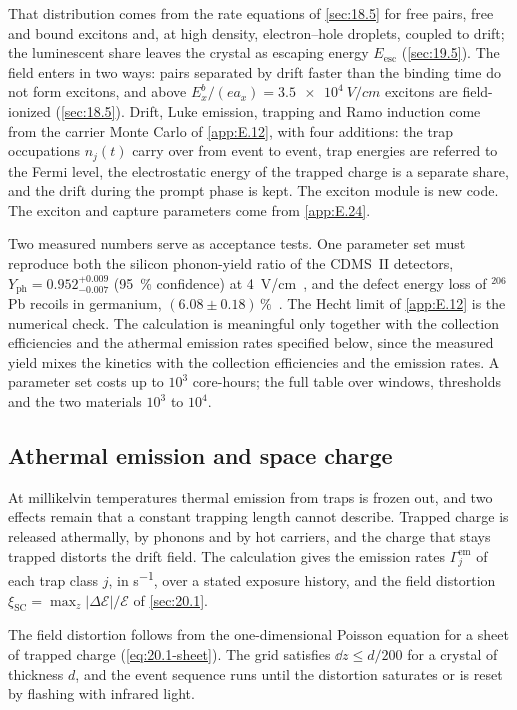 That distribution comes from the rate equations of \cref{sec:18.5} for free pairs, free and bound excitons and, at high density, electron--hole droplets, coupled to drift; the luminescent share leaves the crystal as escaping energy $E_{\mathrm{esc}}$ (\cref{sec:19.5}). The field enters in two ways: pairs separated by drift faster than the binding time do not form excitons, and above $E_x^b/(ea_x) = \SI{3.5e4}{V/cm}$ excitons are field-ionized (\cref{sec:18.5}). Drift, Luke emission, trapping and Ramo induction come from the carrier Monte Carlo of \cref{app:E.12}, with four additions: the trap occupations $n_j(t)$ carry over from event to event, trap energies are referred to the Fermi level, the electrostatic energy of the trapped charge is a separate share, and the drift during the prompt phase is kept. The exciton module is new code. The exciton and capture parameters come from \cref{app:E.24}.

Two measured numbers serve as acceptance tests. One parameter set must reproduce both the silicon phonon-yield ratio of the CDMS~II detectors, $Y_{\mathrm{ph}} = 0.952^{+0.009}_{-0.007}$ (\SI{95}{\percent} confidence) at \SI{4}{V/cm}~\cite[Sect.~4]{agnese2018nuclear}, and the defect energy loss of $^{206}$Pb recoils in germanium, $(6.08 \pm 0.18)\,\%$~\cite{agnese2018energy}. The Hecht limit of \cref{app:E.12} is the numerical check. The calculation is meaningful only together with the collection efficiencies and the athermal emission rates specified below, since the measured yield mixes the kinetics with the collection efficiencies and the emission rates. A parameter set costs up to $10^{3}$ core-hours; the full table over windows, thresholds and the two materials $10^{3}$ to $10^{4}$.

\subsection{Athermal emission and space charge}

At millikelvin temperatures thermal emission from traps is frozen out, and two effects remain that a constant trapping length cannot describe. Trapped charge is released athermally, by phonons and by hot carriers, and the charge that stays trapped distorts the drift field. The calculation gives the emission rates $\varGamma^{\mathrm{em}}_j$ of each trap class $j$, in \si{s^{-1}}, over a stated exposure history, and the field distortion $\xi_{\mathrm{SC}} = \max_z|\Delta\mathcal{E}|/\mathcal{E}$ of \cref{sec:20.1}.

The field distortion follows from the one-dimensional Poisson equation for a sheet of trapped charge (\cref{eq:20.1-sheet}). The grid satisfies $\dd z \le d/200$ for a crystal of thickness $d$, and the event sequence runs until the distortion saturates or is reset by flashing with infrared light.

